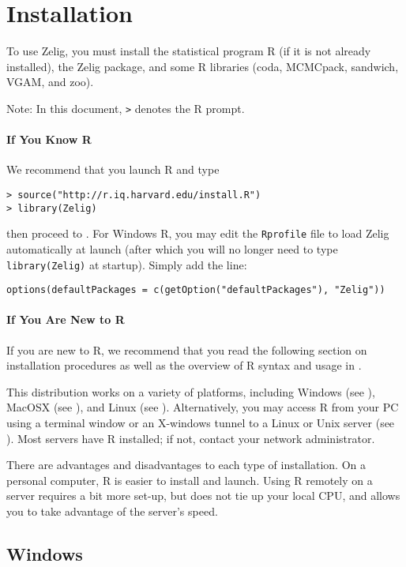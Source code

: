 \chapter{Installation}

To use Zelig, you must install the statistical program R (if it is not
already installed), the Zelig package, and some R libraries (coda,
MCMCpack, sandwich, VGAM, and zoo).  

Note: In this document, {\tt >} denotes the R prompt.  

\subsubsection{If You Know R} 

We recommend that you launch R and type 
\begin{verbatim}
> source("http://r.iq.harvard.edu/install.R")
> library(Zelig)
\end{verbatim}
then proceed to .  For Windows R, you may edit the 
{\tt Rprofile} file to load Zelig automatically at launch (after which you
will no longer need to type {\tt library(Zelig)} at startup).  Simply
add the line:
\begin{verbatim}
options(defaultPackages = c(getOption("defaultPackages"), "Zelig"))
\end{verbatim}

\subsubsection{If You Are New to R}

If you are new to R, we recommend that you read the following section
on installation procedures as well as the overview of R syntax and
usage in .

This distribution works on a variety of platforms, including Windows
(see ), MacOSX (see ), and Linux (see
).  Alternatively, you may access R from your PC using a
terminal window or an X-windows tunnel to a Linux or Unix server (see
).  Most servers have R installed; if not, contact your
network administrator.

There are advantages and disadvantages to each type of installation.
On a personal computer, R is easier to install and launch.  Using R
remotely on a server requires a bit more set-up, but does not tie up
your local CPU, and allows you to take advantage of the server's speed.

\section{Windows}\label{ss:win}

